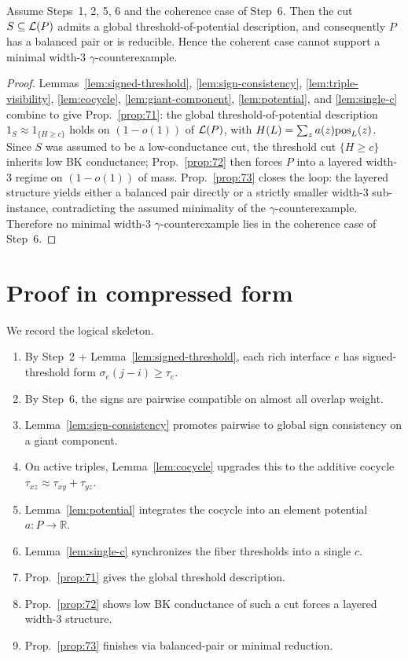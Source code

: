 \begin{theorem}\label{thm:step7}
Assume Steps~1, 2, 5, 6 and the coherence case of Step~6.
Then the cut $S\subseteq\mathcal{L}(P)$ admits a global threshold-of-potential
description, and consequently $P$ has a balanced pair or is reducible.
Hence the coherent case cannot support a minimal width-3
$\gamma$-counterexample.
\end{theorem}

\begin{proof}
Lemmas~\ref{lem:signed-threshold}, \ref{lem:sign-consistency},
\ref{lem:triple-visibility}, \ref{lem:cocycle},
\ref{lem:giant-component}, \ref{lem:potential}, and
\ref{lem:single-c} combine to give Prop.~\ref{prop:71}: the global
threshold-of-potential description $1_S\approx 1_{\{H\ge c\}}$ holds
on $(1-o(1))$ of $\mathcal{L}(P)$, with $H(L)=\sum_z a(z)\mathrm{pos}_L(z)$.  Since
$S$ was assumed to be a low-conductance cut, the threshold cut
$\{H\ge c\}$ inherits low BK conductance; Prop.~\ref{prop:72} then
forces $P$ into a layered width-3 regime on $(1-o(1))$ of mass.
Prop.~\ref{prop:73} closes the loop: the layered structure yields
either a balanced pair directly or a strictly smaller width-3
sub-instance, contradicting the assumed minimality of the
$\gamma$-counterexample.  Therefore no minimal width-3
$\gamma$-counterexample lies in the coherence case of Step~6.
\end{proof}

\section{Proof in compressed form}

We record the logical skeleton.

\begin{enumerate}[nosep]
  \item By Step~2 + Lemma~\ref{lem:signed-threshold}, each rich
    interface $e$ has signed-threshold form $\sigma_e(j-i)\ge\tau_e$.
  \item By Step~6, the signs are pairwise compatible on almost all
    overlap weight.
  \item Lemma~\ref{lem:sign-consistency} promotes pairwise to global
    sign consistency on a giant component.
  \item On active triples, Lemma~\ref{lem:cocycle} upgrades this to
    the additive cocycle
    $\tau_{xz}\approx \tau_{xy}+\tau_{yz}$.
  \item Lemma~\ref{lem:potential} integrates the cocycle into an
    element potential $a:P\to\mathbb{R}$.
  \item Lemma~\ref{lem:single-c} synchronizes the fiber thresholds
    into a single $c$.
  \item Prop.~\ref{prop:71} gives the global threshold description.
  \item Prop.~\ref{prop:72} shows low BK conductance of such a cut
    forces a layered width-3 structure.
  \item Prop.~\ref{prop:73} finishes via balanced-pair or minimal
    reduction.
\end{enumerate}

